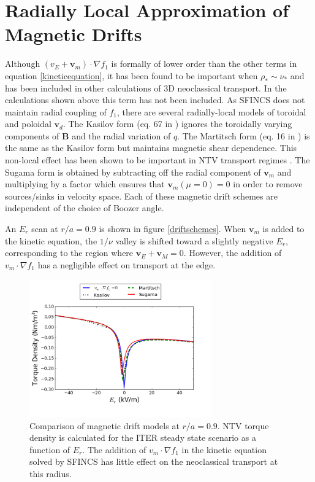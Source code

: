 \documentclass{article}
\begin{document}
\FloatBarrier

\section{Radially Local Approximation of Magnetic Drifts}\label{mds}
Although $(v_E + \bm{v}_m) \cdot \nabla f_1$ is formally of lower order than the other terms in equation \ref{kineticequation}, it has been found to be important when $\rho_* \sim \nu_*$ and has been included in other calculations of 3D neoclassical transport. In the calculations shown above this term has not been included. 
 As SFINCS does not maintain radial coupling of $f_1$, there are several radially-local models of toroidal and poloidal $\bm{v}_d$.  The Kasilov form (eq. 67 in \cite{Kasilov2014}) ignores the toroidally varying components of $\bm{B}$ and the radial variation of $q$. The Martitsch form (eq. 16 in \cite{Martitsch2016}) is the same as the Kasilov form but maintains magnetic shear dependence. This non-local effect has been shown to be important in NTV transport regimes \cite{Martitsch2016}. The Sugama form is obtained by subtracting off the radial component of $\bm{v}_m$ and multiplying by a factor which ensures that $\bm{v}_m (\mu = 0)  = 0$ in order to remove sources/sinks in velocity space. Each of these magnetic drift schemes are independent of the choice of Boozer angle. 

An $E_r$ scan at $r/a = 0.9$ is shown in figure \ref{driftschemes}. When $\bm{v}_m$ is added to the kinetic equation, the $1/\nu$ valley is shifted toward a slightly negative $E_r$, corresponding to the region where $\bm{v}_E + \bm{v}_M = 0$. However, the addition of $v_m \cdot \nabla f_1$ has a negligible effect on transport at the edge. 

\begin{figure}[h!]
\centering
\includegraphics[width=0.7\textwidth]{mdscomparison.png}
\caption{Comparison of magnetic drift models at $r/a = 0.9$. NTV torque density is calculated for the ITER steady state scenario as a function of $E_r$. The addition of $v_m \cdot \nabla f_1$ in the kinetic equation solved by SFINCS has little effect on the neoclassical transport at this radius. }
\end{figure}\label{driftschemes}
\end{document}
